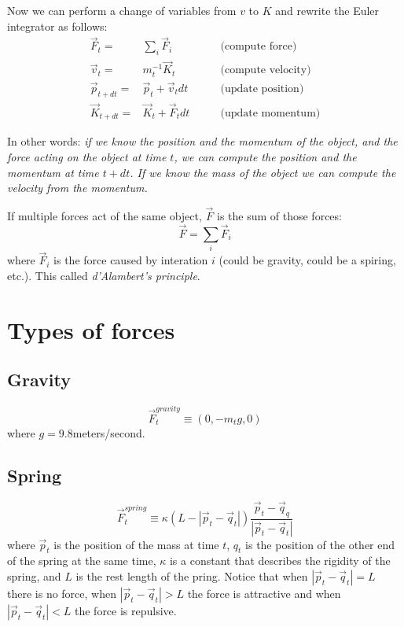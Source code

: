 \documentclass[12pt]{article}
\begin{document}
Now we can perform a change of variables from $v$ to $K$ and rewrite the Euler integrator as follows:
\begin{eqnarray}
\vec F_t =& \sum_i \vec F_i &\qquad \textrm{(compute force)}\\
\vec v_{t} =& m_t^{-1}\vec K_{t} &\qquad \textrm{(compute velocity)}\\
\vec p_{t+dt} =& \vec p_t + \vec v_t dt &\qquad \textrm{(update position)}\\
\vec K_{t+dt} =& \vec K_t + \vec F_t dt &\qquad \textrm{(update momentum)}\label{euler21}
\end{eqnarray}

In other words: {\it if we know the position and the momentum of the object, and the force acting on the object at time $t$, we can compute the position and the momentum at time $t+dt$. If we know the mass of the object we can compute the velocity from the momentum.}

If multiple forces act of the same object, $\vec F$ is the sum of those forces:
\begin{equation}
\vec F = \sum_i \vec F_i
\end{equation}
where $\vec F_i$ is the force caused by interation $i$ (could be gravity, could be a spiring, etc.). This called {\it d'Alambert's principle}.

\section{Types of forces}

\subsection{Gravity}

\begin{equation}
\vec F_t^{gravity} \equiv (0, -m_t g, 0) 
\end{equation}
where $g = 9.8$meters/second.

\subsection{Spring}

\begin{equation}
  \vec F_t^{spring} \equiv \kappa (L - |\vec p_t - \vec q_t|) \frac{\vec p_t-\vec q_q}{|\vec p_t-\vec q_t|}
\end{equation}
where $\vec p_t$ is the position of the mass at time $t$, $q_t$ is the position of the other end of the spring at the same time, $\kappa$ is a constant that describes the rigidity of the spring, and $L$ is the rest length of the pring. Notice that when $|\vec p_t - \vec q_t|=L$ there is no force, when $|\vec p_t - \vec q_t|>L$ the force is attractive and when $|\vec p_t - \vec q_t|<L$ the force is repulsive. 
\end{document}
